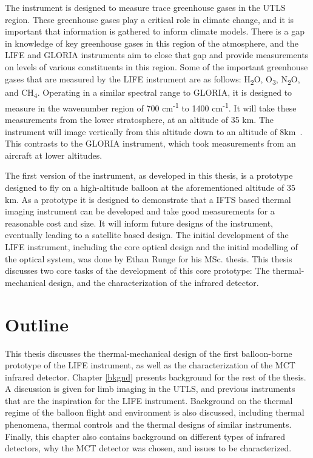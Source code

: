 The instrument is designed to measure trace greenhouse gases in the UTLS region. These greenhouse gases play a critical role in climate change, and it is important that information is gathered to inform climate models. There is a gap in knowledge of key greenhouse gases in this region of the atmosphere, and the LIFE and GLORIA instruments aim to close that gap and provide measurements on levels of various constituents in this region. Some of the important greenhouse gases that are measured by the LIFE instrument are as follows: H\textsubscript{2}O, O\textsubscript{3}, N\textsubscript{2}O, and CH\textsubscript{4}. Operating in a similar spectral range to GLORIA, it is designed to measure in the wavenumber region of 700 cm\textsuperscript{-1} to 1400 cm\textsuperscript{-1}. It will take these measurements from the lower stratosphere, at an altitude of 35 km. The instrument will image vertically from this altitude down to an altitude of 8km~\citep{ethans_thesis}. This contrasts to the GLORIA instrument, which took measurements from an aircraft at lower altitudes.

The first version of the instrument, as developed in this thesis, is a prototype designed to fly on a high-altitude balloon at the aforementioned altitude of 35 km. As a prototype it is designed to demonstrate that a IFTS based thermal imaging instrument can be developed and take good measurements for a reasonable cost and size. It will inform future designs of the instrument, eventually leading to a satellite based design. The initial development of the LIFE instrument, including the core optical design and the initial modelling of the optical system, was done by Ethan Runge for his MSc. thesis. This thesis discusses two core tasks of the development of this core prototype: The thermal-mechanical design, and the characterization of the infrared detector.

\section{Outline}
This thesis discusses the thermal-mechanical design of the first balloon-borne prototype of the LIFE instrument, as well as the characterization of the MCT infrared detector. Chapter \ref{bkgnd} presents background for the rest of the thesis. A discussion is given for limb imaging in the UTLS, and previous instruments that are the inspiration for the LIFE instrument. Background on the thermal regime of the balloon flight and environment is also discussed, including thermal phenomena, thermal controls and the thermal designs of similar instruments. Finally, this chapter also contains background on different types of infrared detectors, why the MCT detector was chosen, and issues to be characterized.

